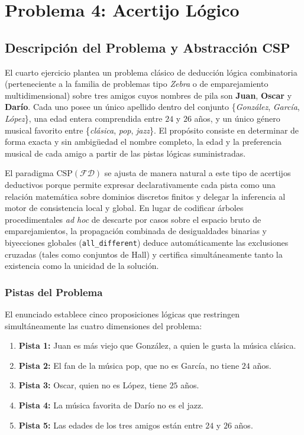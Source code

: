 \section{Problema 4: Acertijo Lógico}
\label{sec:acertijo_logico}

\subsection{Descripción del Problema y Abstracción CSP}

El cuarto ejercicio plantea un problema clásico de deducción lógica combinatoria (perteneciente a la familia de problemas tipo \emph{Zebra} o de emparejamiento multidimensional) sobre tres amigos cuyos nombres de pila son \textbf{Juan}, \textbf{Oscar} y \textbf{Darío}. Cada uno posee un único apellido dentro del conjunto \{\emph{González}, \emph{García}, \emph{López}\}, una edad entera comprendida entre $24$ y $26$ años, y un único género musical favorito entre \{\emph{clásica}, \emph{pop}, \emph{jazz}\}. El propósito consiste en determinar de forma exacta y sin ambigüedad el nombre completo, la edad y la preferencia musical de cada amigo a partir de las pistas lógicas suministradas.

El paradigma $\text{CSP}(\mathcal{FD})$ se ajusta de manera natural a este tipo de acertijos deductivos porque permite expresar declarativamente cada pista como una relación matemática sobre dominios discretos finitos y delegar la inferencia al motor de consistencia local y global. En lugar de codificar árboles procedimentales \emph{ad hoc} de descarte por casos sobre el espacio bruto de emparejamientos, la propagación combinada de desigualdades binarias y biyecciones globales (\texttt{all\_different}) deduce automáticamente las exclusiones cruzadas (tales como conjuntos de Hall) y certifica simultáneamente tanto la existencia como la unicidad de la solución.

\subsubsection{Pistas del Problema}

El enunciado establece cinco proposiciones lógicas que restringen simultáneamente las cuatro dimensiones del problema:
\begin{enumerate}
    \item \textbf{Pista 1:} Juan es más viejo que González, a quien le gusta la música clásica.
    \item \textbf{Pista 2:} El fan de la música pop, que no es García, no tiene $24$ años.
    \item \textbf{Pista 3:} Oscar, quien no es López, tiene $25$ años.
    \item \textbf{Pista 4:} La música favorita de Darío no es el jazz.
    \item \textbf{Pista 5:} Las edades de los tres amigos están entre $24$ y $26$ años.
\end{enumerate}

